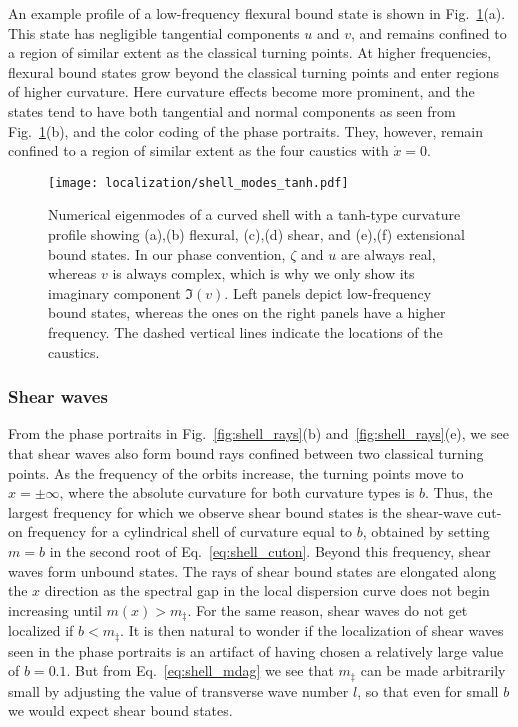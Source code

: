 An example profile of a low-frequency flexural bound state is shown in Fig.~\ref{fig:shell_modes_tanh}(a).
This state has negligible tangential components $u$ and $v$, and remains confined to a region of similar extent as the classical turning points.
At higher frequencies, flexural bound states grow beyond the classical turning points and enter regions of higher curvature.
Here curvature effects become more prominent, and the states tend to have both tangential and normal components as seen from Fig.~\ref{fig:shell_modes_tanh}(b), and the color coding of the phase portraits.
They, however, remain confined to a region of similar extent as the four caustics with $\dot{x} = 0$.
%
\begin{figure}
  \begin{center}
    \texttt{[image: localization/shell\_modes\_tanh.pdf]}
  \end{center}
  \caption{
  Numerical eigenmodes of a curved shell with a tanh-type curvature profile showing (a),(b) flexural, (c),(d) shear, and (e),(f) extensional bound states.
  In our phase convention, $\zeta$ and $u$ are always real, whereas $v$ is always complex, which is why we only show its imaginary component $\Im(v)$.
  Left panels depict low-frequency bound states, whereas the ones on the right panels have a higher frequency.
  The dashed vertical lines indicate the locations of the caustics.
}
  \label{fig:shell_modes_tanh}
\end{figure}

\subsubsection{Shear waves}

From the phase portraits in Fig.~\ref{fig:shell_rays}(b) and~\ref{fig:shell_rays}(e), we see that shear waves also form bound rays confined between two classical turning points.
As the frequency of the orbits increase, the turning points move to $x = \pm \infty$, where the absolute curvature for both curvature types is $b$.
Thus, the largest frequency for which we observe shear bound states is the shear-wave cut-on frequency for a cylindrical shell of curvature equal to $b$, obtained by setting $m = b$ in the second root of Eq.~\eqref{eq:shell_cuton}.
Beyond this frequency, shear waves form unbound states.
The rays of shear bound states are elongated along the $x$ direction as the spectral gap in the local dispersion curve does not begin increasing until $m(x) > m_{\ddag}$.
For the same reason, shear waves do not get localized if $b < m_{\ddag}$.
It is then natural to wonder if the localization of shear waves seen in the phase portraits is an artifact of having chosen a relatively large value of $b = 0.1$.
But from Eq.~\eqref{eq:shell_mdag} we see that $m_{\ddag}$ can be made arbitrarily small by adjusting the value of transverse wave number $l$, so that even for small $b$ we would expect shear bound states.

